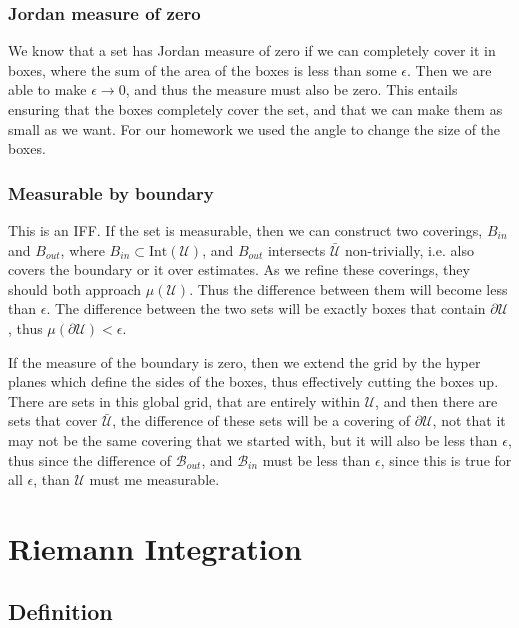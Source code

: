 \documentclass[12pt]{armath}
\newcommand{\U}{\mathcal{U}}
\newcommand{\B}{\mathcal{B}}
\newcommand{\ra}{\rightarrow}
\begin{document}
\subsubsection{Jordan measure of zero}%
\label{ssub:jordan_measure_of_zero}

We know that a set has Jordan measure of zero if we can completely cover it in
boxes, where the sum of the area of the boxes is less than some $\epsilon$.
Then we are able to make $\epsilon\ra0$, and thus the measure must also be
zero. This entails ensuring that the boxes completely cover the set, and that
we can make them as small as we want. For our homework we used the angle to
change the size of the boxes.

\subsubsection{Measurable by boundary}%
\label{ssub:measurable_by_boundary}

This is an IFF. If the set is measurable, then we can construct two coverings,
$B_{in}$ and $B_{out}$, where $B_{in}\subset\text{Int}(\U)$, and $B_{out}$
intersects $\bar{\U}$ non-trivially, i.e. also covers the boundary or it over
estimates. As we refine these coverings, they should both approach $\mu(\U)$.
Thus the difference between them will become less than $\epsilon$. The
difference between the two sets will be exactly boxes that contain $\partial
\U$, thus $\mu(\partial\U)<\epsilon$.

If the measure of the boundary is zero, then we extend the grid by the
hyper planes which define the sides of the boxes, thus effectively cutting the
boxes up. There are sets in this global grid, that are entirely within $\U$,
and then there are sets that cover $\bar{\U}$, the difference of these sets
will be a covering of $\partial \U$, not that it may not be the same covering
that we started with, but it will also be less than $\epsilon$, thus since the
difference of $\B_{out}$, and $\B_{in}$ must be less than $\epsilon$, since
this is true for all $\epsilon$, than $\U$ must me measurable.

\section{Riemann Integration}%
\label{sec:riemann_integration}

\subsection{Definition}%
\label{sub:definition}
\end{document}
